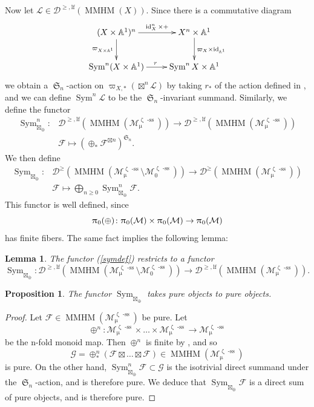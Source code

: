 \documentclass[a4paper,10pt]{amsart}
\renewcommand{\zeta}{\upzeta}
\renewcommand{\pi}{\uppi\hspace{0.05em}}
\renewcommand{\mu}{\upmu}
\newtheorem{proposition}[theorem]{Proposition}
\newtheorem{lemma}[theorem]{Lemma}
\newcommand{\Msp}{\mathcal{M}}
\DeclareMathOperator{\sst}{-ss}
\DeclareMathOperator{\FreeComm}{Sym}
\DeclareMathOperator{\MMHM}{MMHM}
\DeclareMathOperator{\Sym}{Sym}
\DeclareMathOperator{\SSym}{\mathfrak{S}}
\DeclareMathOperator{\id}{id}
\newcommand{\Du}{\mathcal{D}^{\geq}}
\newcommand{\Dulf}{\mathcal{D}^{\geq, \mathrm{lf}}}
\begin{document}
Now let $\mathcal{L}\in \Dulf(\MMHM(X))$.  Since there is a commutative diagram
\[
\xymatrix{
(X\times \mathbb{A}^1)^n\ar[d]_{\varpi_{X\times\mathbb{A}^1}}\ar[r]^-{\id_X^n\times +}&X^n\times\mathbb{A}^1\ar[d]^{\varpi_X\times \id_{\mathbb{A}^1}}\\
\Sym^n(X\times\mathbb{A}^1)\ar[r]^r&\Sym^nX\times\mathbb{A}^1
}
\]
we obtain a $\SSym_n$-action on $\varpi_{X,*}(\boxtimes^n\mathcal{L})$ by taking $r_*$ of the action defined in \cite{MSS11}, and we can define $\Sym^n\!\mathcal{L}$ to be the $\SSym_n$-invariant summand.  Similarly, we define the functor
\begin{align*}
\Sym^n_{\boxtimes_{\oplus}}\colon&\Dulf(\MMHM(\Msp_{\mu}^{\zeta\sst}))\rightarrow \Dulf(\MMHM(\Msp_{\mu}^{\zeta\sst}))\\
&\mathcal{F}\mapsto (\oplus_*\mathcal{F}^{\boxtimes n})^{\SSym_n}.
\end{align*}
We then define
\begin{align}
\label{symdef}
\FreeComm_{\boxtimes_{\oplus}}\colon&\Du(\MMHM(\Msp^{\zeta\sst}_{\mu}\setminus \Msp_0^{\zeta\sst}))\rightarrow \Du(\MMHM(\Msp^{\zeta\sst}_{\mu}))\\ \nonumber
&\mathcal{F}\mapsto\bigoplus_{n\geq 0}\Sym^n_{\boxtimes_{\oplus}}\mathcal{F}.
\end{align}
This functor is well defined, since 
\[
\pi_0(\oplus)\colon \pi_0(\Msp)\times\pi_0(\Msp)\rightarrow\pi_0(\Msp)
\]
has finite fibers.  The same fact implies the following lemma:
\begin{lemma}
\label{lfRem}
The functor (\ref{symdef}) restricts to a functor
\[
\FreeComm_{\boxtimes_{\oplus}}\colon\Dulf(\MMHM(\Msp^{\zeta\sst}_{\mu}\setminus \Msp^{\zeta\sst}_0))\rightarrow \Dulf(\MMHM(\Msp^{\zeta\sst}_{\mu})).
\]
\end{lemma}
\begin{proposition}
\label{symmPure}
The functor $\FreeComm_{\boxtimes_{\oplus}}$ takes pure objects to pure objects.
\end{proposition}
\begin{proof}
Let $\mathcal{F}\in\MMHM(\Msp_{\mu}^{\zeta\sst})$ be pure.  Let 
\[
\oplus^n\colon \Msp_{\mu}^{\zeta\sst}\times\ldots\times \Msp_{\mu}^{\zeta\sst}\rightarrow \Msp_{\mu}^{\zeta\sst}
\]
be the n-fold monoid map.  Then $\oplus^n$ is finite by \cite[Lem.2.1]{Meinhardt14}, and so 
\[
\mathcal{G}=\oplus^n_*\left(\mathcal{F}\boxtimes\ldots \boxtimes\mathcal{F}\right)\in\MMHM(\Msp_{\mu}^{\zeta\sst})
\]
is pure.  On the other hand, $\FreeComm_{\boxtimes_{\oplus}}^n\mathcal{F}\subset \mathcal{G}$ is the isotrivial direct summand under the $\SSym_n$-action, and is therefore pure.  We deduce that $\FreeComm_{\boxtimes_{\oplus}}\mathcal{F}$ is a direct sum of pure objects, and is therefore pure.
\end{proof}
\end{document}
